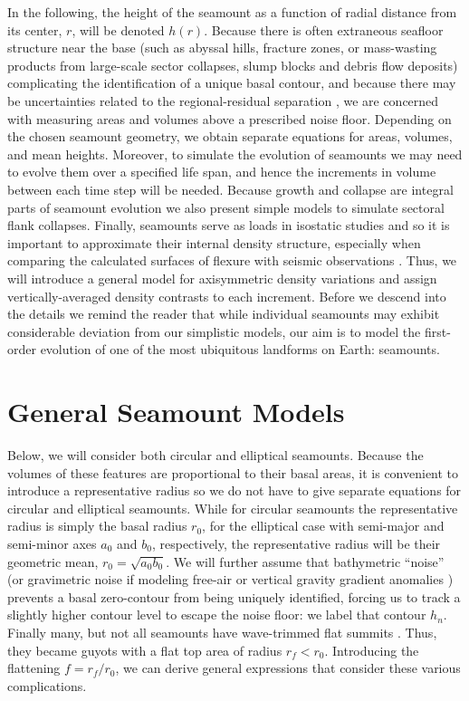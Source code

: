 In the following, the height of the seamount as a function of radial distance from
its center, $r$, will be denoted $h(r)$. Because there is often extraneous seafloor structure near the base
(such as abyssal hills, fracture zones, or mass-wasting products from large-scale sector collapses, slump blocks
and debris flow deposits) complicating the identification of a unique basal contour, and because there may be uncertainties
related to the regional-residual separation \citep[e.g.,~][]{W2016}, we are concerned with measuring areas and volumes
above a prescribed noise floor.  Depending on the chosen seamount geometry, we obtain separate equations for areas,
volumes, and mean heights.  Moreover, to simulate the evolution of seamounts we may need to evolve them over a
specified life span, and hence the increments in volume between each time step will be needed. Because growth
and collapse are integral parts of seamount evolution \citep[e.g.,~][]{HJ2020} we also present simple models to
simulate sectoral flank collapses.  Finally, seamounts serve as loads in isostatic studies and so it is important
to approximate their internal density structure, especially when comparing the calculated surfaces of flexure with
seismic observations \citep[e.g.,~][]{W2021}. Thus, we will introduce a general model for axisymmetric density variations
and assign vertically-averaged density contrasts to each increment. Before we descend into the details we remind
the reader that while individual seamounts may exhibit considerable deviation from our simplistic models, our aim
is to model the first-order evolution of one of the most ubiquitous landforms on Earth: seamounts.

\section{General Seamount Models}
\label{sec:shape}
Below, we will consider both circular and elliptical seamounts.  Because the volumes of these features are proportional
to their basal areas, it is convenient to introduce a representative radius so we do not have to give
separate equations for circular and elliptical seamounts.  While for circular seamounts the representative
radius is simply the basal radius $r_0$, for the elliptical case with semi-major and semi-minor axes
$a_0$ and $b_0$, respectively, the representative radius will be their geometric mean, $r_0 = \sqrt{a_0 b_0}$.
We will further assume that bathymetric ``noise'' (or gravimetric noise if modeling free-air or vertical gravity
gradient anomalies \citep[e.g.,~][]{WL1997,W2001,KW2011}) prevents a basal zero-contour from being uniquely identified,
forcing us to track a slightly higher contour level to escape the noise floor: we label that contour
$h_n$.  Finally many, but not all seamounts have wave-trimmed flat summits \citep[e.g.,~][]{CH2007}. Thus, they became guyots with
a flat top area of radius $r_f < r_0$.  Introducing the flattening $f = r_f/r_0$, we can derive general expressions
that consider these various complications.


